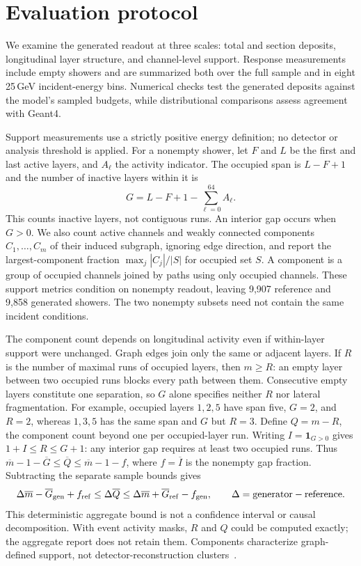 \documentclass[11pt]{article}
\begin{document}
\section{Evaluation protocol}
\label{sec:diagnostics}

We examine the generated readout at three scales: total and section deposits, longitudinal layer structure, and channel-level support. Response measurements include empty showers and are summarized both over the full sample and in eight 25\,GeV incident-energy bins. Numerical checks test the generated deposits against the model's sampled budgets, while distributional comparisons assess agreement with Geant4.

Support measurements use a strictly positive energy definition; no detector or analysis threshold is applied. For a nonempty shower, let $F$ and $L$ be the first and last active layers, and $A_\ell$ the activity indicator. The occupied span is $L-F+1$ and the number of inactive layers within it is
\begin{equation}
 G=L-F+1-\sum_{\ell=0}^{64}A_\ell.
 \label{eq:gaps}
\end{equation}
This counts inactive layers, not contiguous runs. An interior gap occurs when $G>0$. We also count active channels and weakly connected components $C_1,\ldots,C_m$ of their induced subgraph, ignoring edge direction, and report the largest-component fraction $\max_j|C_j|/|S|$ for occupied set $S$. A component is a group of occupied channels joined by paths using only occupied channels. These support metrics condition on nonempty readout, leaving 9,907 reference and 9,858 generated showers. The two nonempty subsets need not contain the same incident conditions.

The component count depends on longitudinal activity even if within-layer support were unchanged. Graph edges join only the same or adjacent layers. If $R$ is the number of maximal runs of occupied layers, then $m\geq R$: an empty layer between two occupied runs blocks every path between them. Consecutive empty layers constitute one separation, so $G$ alone specifies neither $R$ nor lateral fragmentation. For example, occupied layers $1,2,5$ have span five, $G=2$, and $R=2$, whereas $1,3,5$ has the same span and $G$ but $R=3$. Define $Q=m-R$, the component count beyond one per occupied-layer run. Writing $I=\mathbf 1_{G>0}$ gives $1+I\leq R\leq G+1$: any interior gap requires at least two occupied runs. Thus $\overline m-1-\overline G\leq\overline Q\leq\overline m-1-f$, where $f=\overline I$ is the nonempty gap fraction. Subtracting the separate sample bounds gives
\[
 \Delta\overline m-\overline G_{\rm gen}+f_{\rm ref}\leq\Delta\overline Q
 \leq\Delta\overline m+\overline G_{\rm ref}-f_{\rm gen},
 \qquad \Delta=\mathrm{generator}-\mathrm{reference}.
\]
This deterministic aggregate bound is not a confidence interval or causal decomposition. With event activity masks, $R$ and $Q$ could be computed exactly; the aggregate report does not retain them. Components characterize graph-defined support, not detector-reconstruction clusters~\cite{atlastopocluster}.
\end{document}
